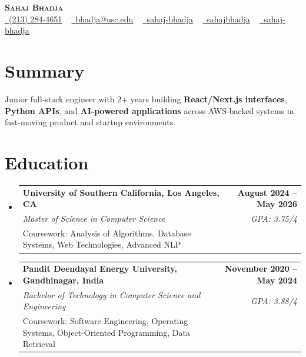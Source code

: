 \documentclass[letterpaper,10pt]{article}
\makeatletter
\newcommand{\resumeEduSubheading}[5]{\vspace{-1pt}\item\begin{tabular*}{1.0\textwidth}[t]{l@{\extracolsep{\fill}}r}\textbf{#1} & \textbf{\small #2} \\\textit{\small #3} & \textit{\small #4} \\\small #5 & \\\end{tabular*}\vspace{-4pt}}
\newcommand{\resumeSubHeadingListStart}{\begin{itemize}[leftmargin=0.0in, label={}]}
\newcommand{\resumeSubHeadingListEnd}{\end{itemize}}
\makeatother
\begin{document}
\begin{center}
{\Huge \scshape \textbf{Sahaj Bhadja}} \\ \vspace{1pt}
\small \href{tel:(213) 284-4651}{\faPhone\ \underline{(213) 284-4651}} ~ \href{mailto: bhadja@usc.edu}{\raisebox{-0.2\height}\faEnvelope\ \underline{bhadja@usc.edu}} ~
\href{https://www.linkedin.com/in/sahaj-bhadja/}{\raisebox{-0.2\height}\faLinkedin\ \underline{sahaj-bhadja}} ~ \href{https://github.com/SAHAJ-BHADJA}{\raisebox{-0.2\height}\faGithub\ \underline{sahajbhadja}} ~
\href{https://sahaj-bhadja.vercel.app/}{\raisebox{-0.2\height}\faGlobe\ \underline{sahaj-bhadja}}
\end{center}
\vspace{-16pt}
\section{Summary}
\begin{itemize}[leftmargin=0.15in, label={}]
\small{\item{Junior full-stack engineer with 2+ years building \textbf{React/Next.js interfaces}, \textbf{Python APIs}, and \textbf{AI-powered applications} across AWS-backed systems in fast-moving product and startup environments.}}
\end{itemize}
\vspace{-6pt}
\section{Education}
\resumeSubHeadingListStart
\resumeEduSubheading{University of Southern California, Los Angeles, CA}{August 2024 -- May 2026}{Master of Science in Computer Science}{GPA: 3.75/4}{Coursework: Analysis of Algorithms, Database Systems, Web Technologies, Advanced NLP}
\vspace{-9pt}
\resumeEduSubheading{Pandit Deendayal Energy University, Gandhinagar, India}{November 2020 -- May 2024}{Bachelor of Technology in Computer Science and Engineering}{GPA: 3.88/4}{Coursework: Software Engineering, Operating Systems, Object-Oriented Programming, Data Retrieval}
\resumeSubHeadingListEnd
\vspace{-6pt}
\end{document}
